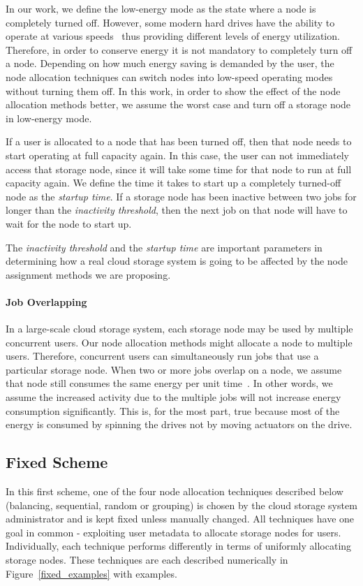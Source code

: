 \documentclass[preprint,12pt]{elsarticle}
\begin{document}
In our work, we define the low-energy mode as the state where a node is completely turned off. However,
some modern hard drives have the ability to operate at various
speeds~\cite{Gurumurthi:2003:DDS:871656.859638} thus providing
different levels of energy utilization.
Therefore, in order to conserve energy it is not mandatory to completely turn off a node. Depending on how
much energy saving is demanded by the user, the node allocation techniques can switch nodes into
low-speed operating modes without turning them off. In this work, in order to show the effect of the
node allocation methods better, we assume the worst case and turn off a storage node in low-energy
mode.

If a user is allocated to a node that has been turned off, then that
node needs to start operating at full capacity again. In this case, the user can not immediately access
that storage node, since it will take some time for that node to run at full capacity again. We define the time
it takes to start up a completely turned-off node as the \textit{startup time}. If a storage node has been inactive
between two jobs for longer than the \textit{inactivity threshold}, then the next job on that node
will have to wait for the node to start up.

The \textit{inactivity threshold} and the \textit{startup time} are
important parameters in determining how a real cloud storage
system is going to be affected by the node assignment methods we are proposing.

\paragraph{Job Overlapping}
In a large-scale cloud storage system, each storage node may be used by multiple concurrent users. Our node allocation
methods might allocate a node to multiple users. Therefore, concurrent users can simultaneously
run jobs that use a particular storage node. When two or more jobs overlap on a node, we assume that
node still consumes the same energy per unit
time~\cite{Tsirogiannis:2010:AEE:1807167.1807194}. In other words,
we assume the increased activity due to the multiple jobs will not
increase energy consumption significantly. This is, for the most
part, true because most of the energy is consumed by spinning the
drives not by moving actuators on the drive.

\subsection{Fixed Scheme}
\label{fixed}
In this first scheme, one of the four node allocation techniques described below 
(balancing, sequential, random or grouping) is chosen by the cloud
storage system administrator
and is kept fixed unless manually changed. All techniques have one goal
in common - exploiting user metadata to allocate storage nodes for users. Individually,
each technique performs differently in terms of uniformly allocating storage nodes.
These techniques are each described numerically in Figure~\ref{fixed_examples} with examples.
\end{document}
